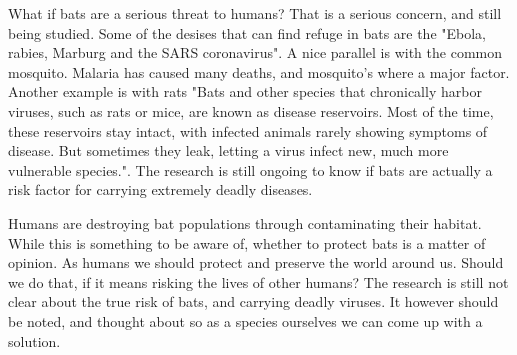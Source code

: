 \documentclass[12pt]{article}
\begin{document}
What if bats are a serious threat to humans? That is a serious concern, and still being studied. Some of the desises that can find refuge in bats are the "Ebola, rabies, Marburg and the SARS coronavirus"\cite{wired}. A nice parallel is with the common mosquito. Malaria has caused many deaths, and mosquito's where a major factor.  Another example is with rats "Bats and other species that chronically harbor viruses, such as rats or mice, are known as disease reservoirs. Most of the time, these reservoirs stay intact, with infected animals rarely showing symptoms of disease. But sometimes they leak, letting a virus infect new, much more vulnerable species."\cite{wired}. The research is still ongoing to know if bats are actually a risk factor for carrying extremely deadly diseases.

Humans are destroying bat populations through contaminating their habitat. While this is something to be aware of, whether to protect bats is a matter of opinion. As humans we should protect and preserve the world around us. Should we do that, if it means risking the lives of other humans? The research is still not clear about the true risk of bats, and carrying deadly viruses. It however should be noted, and thought about so as a species ourselves we can come up with a solution.



\end{document}
